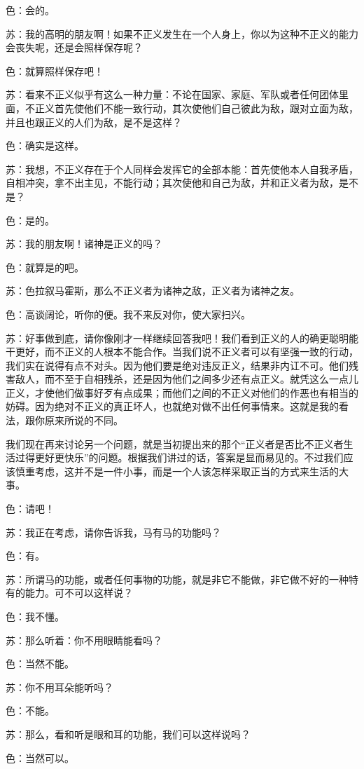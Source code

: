 \documentclass[12pt,oneside]{book}
\begin{document}
色：会的。

苏：我的高明的朋友啊！如果不正义发生在一个人身上，你以为这种不正义的能力会丧失呢，还是会照样保存呢？

色：就算照样保存吧！

苏：看来不正义似乎有这么一种力量：不论在国家、家庭、军队或者任何团体里面，不正义首先使他们不能一致行动，其次使他们自己彼此为敌，跟对立面为敌，并且也跟正义的人们为敌，是不是这样？

色：确实是这样。

苏：我想，不正义存在于个人同样会发挥它的全部本能：首先使他本人自我矛盾，自相冲突，拿不出主见，不能行动；其次使他和自己为敌，并和正义者为敌，是不是？

色：是的。

苏：我的朋友啊！诸神是正义的吗？

色：就算是的吧。

苏：色拉叙马霍斯，那么不正义者为诸神之敌，正义者为诸神之友。

色：高谈阔论，听你的便。我不来反对你，使大家扫兴。

苏：好事做到底，请你像刚才一样继续回答我吧！我们看到正义的人的确更聪明能干更好，而不正义的人根本不能合作。当我们说不正义者可以有坚强一致的行动，我们实在说得有点不对头。因为他们要是绝对违反正义，结果非内讧不可。他们残害敌人，而不至于自相残杀，还是因为他们之间多少还有点正义。就凭这么一点儿正义，才使他们做事好歹有点成果；而他们之间的不正义对他们的作恶也有相当的妨碍。因为绝对不正义的真正坏人，也就绝对做不出任何事情来。这就是我的看法，跟你原来所说的不同。

我们现在再来讨论另一个问题，就是当初提出来的那个“正义者是否比不正义者生活过得更好更快乐”的问题。根据我们讲过的话，答案是显而易见的。不过我们应该慎重考虑，这并不是一件小事，而是一个人该怎样采取正当的方式来生活的大事。

色：请吧！

苏：我正在考虑，请你告诉我，马有马的功能吗？

色：有。

苏：所谓马的功能，或者任何事物的功能，就是非它不能做，非它做不好的一种特有的能力。可不可以这样说？

色：我不懂。

苏：那么听着：你不用眼睛能看吗？

色：当然不能。

苏：你不用耳朵能听吗？

色：不能。

苏：那么，看和听是眼和耳的功能，我们可以这样说吗？

色：当然可以。
\end{document}
